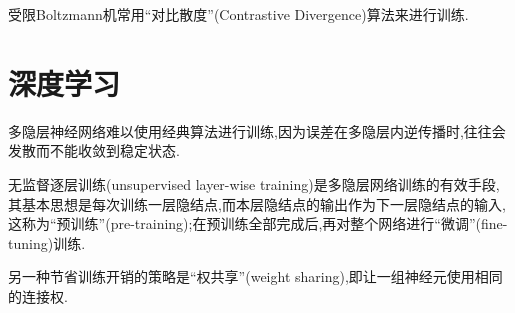 受限Boltzmann机常用``对比散度''(Contrastive Divergence)算法来进行训练.

\section{深度学习}

多隐层神经网络难以使用经典算法进行训练,因为误差在多隐层内逆传播时,往往会发散而不能收敛到稳定状态.

无监督逐层训练(unsupervised layer-wise training)是多隐层网络训练的有效手段,其基本思想是每次训练一层隐结点,而本层隐结点的输出作为下一层隐结点的输入,这称为``预训练''(pre-training);在预训练全部完成后,再对整个网络进行``微调''(fine-tuning)训练.

另一种节省训练开销的策略是``权共享''(weight sharing),即让一组神经元使用相同的连接权.